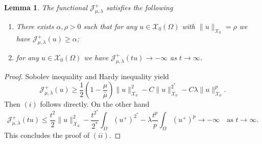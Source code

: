 \documentclass[11pt]{article}
\newtheorem{lemma}{Lemma}[section] %
\newcommand{\al} {\alpha}
\newcommand{\om} {\Omega}
\newcommand{\la} {\lambda}
\newcommand{\lv}{\lVert}
\newcommand{\rv}{\rVert}
\newcommand{\X}{\mathcal{X}_0} %
\newcommand{\J}{\mathcal{J}_{\mu,\lambda}} %
\begin{document}

\begin{lemma}\label{lem:mountain_pass_superlinear}
The functional $\J^+$ satisfies the following
\begin{enumerate}
    \item[$(i)$] There exists $\al, \rho > 0$ such that for any $u \in \X(\om)$ with $\lv u \rv_{\X} = \rho$ we have $\J^+(u) \geq \al$;
    \item[$(ii)$] for any $u \in \X(\om)$ we have $\J^+(tu) \to - \infty$ as $ t \to \infty$.
\end{enumerate}
\end{lemma}
\begin{proof}
Sobolev inequality and Hardy inequality yield
\begin{equation*}
    \J^+(u) \geq \frac{1}{2} \left( 1 - \frac{\mu}{\bar \mu} \right) \lv u \rv_{\X}^2 - C \lv u \rv_{\X}^{2^*} - C \la \lv u \rv_{\X}^p.
\end{equation*}
Then $(i)$ follows directly. On the other hand
\begin{equation*}
    \J^+(tu) \leq \frac{t^2}{2} \lv u \rv_{\X}^2 - \frac{t^{2^*}}{2^*} \int_{\om} (u^+)^{2^*} - \la \frac{ t^p}{p} \int_{\om} (u^+)^p \to - \infty \quad \text{as } t \to \infty.
\end{equation*}
This concludes the proof of $(ii)$.
\end{proof}
\end{document}
